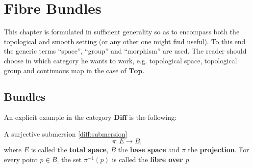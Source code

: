 \chapter{Fibre Bundles}\label{chapter:bundles}

    This chapter is formulated in sufficient generality so as to encompass both the topological and smooth setting (or any other one might find useful). To this end the generic terms ``space'', ``group'' and ``morphism'' are used. The reader should choose in which category he wants to work, e.g. topological space, topological group and continuous map in the case of $\mathbf{Top}$.

\section{Bundles}


    An explicit example in the category $\mathbf{Diff}$ is the following:
    \begin{example}
        A surjective submersion \ref{diff:submersion} \[\pi:E\rightarrow B,\] where $E$ is called the \textbf{total space}, $B$ the \textbf{base space} and $\pi$ the \textbf{projection}. For every point $p\in B$, the set $\pi^{-1}(p)$ is called the \textbf{fibre over $p$}.
    \end{example}

